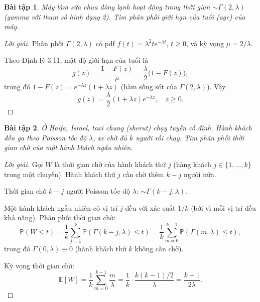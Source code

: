 \documentclass[8pt,a4paper]{article}
\newtheorem{exercise}{Bài tập}
\newenvironment{solution}{\begin{proof}[Lời giải]}{\end{proof}}
\newcommand{\prob}{\mathbb{P}}
\newcommand{\E}{\mathbb{E}}
\begin{document}
\begin{exercise}
Máy làm sữa chua đông lạnh hoạt động trong thời gian $\sim \Gamma(2, \lambda)$ (gamma với tham số hình dạng 2). Tìm phân phối giới hạn của tuổi (age) của máy.
\end{exercise}
\begin{solution}
Phân phối $\Gamma(2,\lambda)$ có pdf $f(t) = \lambda^2 t e^{-\lambda t}$, $t \geq 0$, và kỳ vọng $\mu = 2/\lambda$.

Theo Định lý 3.11, mật độ giới hạn của tuổi là
\[
  g(z) = \frac{1 - F(z)}{\mu} = \frac{\lambda}{2}\bigl(1 - F(z)\bigr),
\]
trong đó $1 - F(z) = e^{-\lambda z}(1 + \lambda z)$ (hàm sống sót của $\Gamma(2,\lambda)$). Vậy
\[
  g(z) = \frac{\lambda}{2}(1+\lambda z)e^{-\lambda z}, \quad z \geq 0.
\]
\end{solution}

\begin{exercise}
Ở Haifa, Israel, taxi chung (sherut) chạy tuyến cố định. Hành khách đến ga theo Poisson tốc độ $\lambda$, xe chờ đủ $k$ người rồi chạy. Tìm phân phối thời gian chờ của một hành khách ngẫu nhiên.
\end{exercise}
\begin{solution}
Gọi $W$ là thời gian chờ của hành khách thứ $j$ (hàng khách $j \in \{1,\ldots,k\}$ trong một chuyến). Hành khách thứ $j$ cần chờ thêm $k - j$ người nữa.

Thời gian chờ $k - j$ người Poisson tốc độ $\lambda$: $\sim \Gamma(k-j, \lambda)$.

Một hành khách ngẫu nhiên có vị trí $j$ đều với xác suất $1/k$ (bởi vì mỗi vị trí đều khả năng). Phân phối thời gian chờ:
\[
  \prob(W \leq t) = \frac{1}{k}\sum_{j=1}^{k} \prob(\Gamma(k-j,\lambda) \leq t) = \frac{1}{k}\sum_{m=0}^{k-1} \prob(\Gamma(m,\lambda) \leq t),
\]
trong đó $\Gamma(0,\lambda) \equiv 0$ (hành khách thứ $k$ không cần chờ).

Kỳ vọng thời gian chờ:
\[
  \E[W] = \frac{1}{k}\sum_{m=0}^{k-1} \frac{m}{\lambda} = \frac{1}{k}\cdot\frac{k(k-1)/2}{\lambda} = \frac{k-1}{2\lambda}.
\]
\end{solution}
\end{document}
